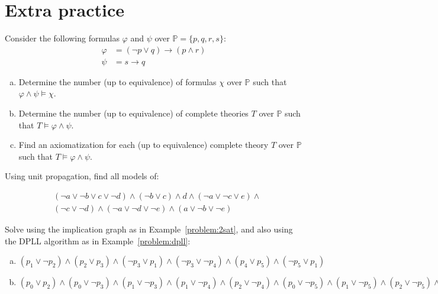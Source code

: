     
\section*{Extra practice}
    

\begin{problem}

    Consider the following formulas $\varphi$ and $\psi$ over $\mathbb P=\{p, q, r, s\}$:
    \begin{align*}
        \varphi &= (\neg p \vee  q)\to(p\wedge r)\\
        \psi &= s\to q
    \end{align*}
    \begin{enumerate}[(a)]
        \item Determine the number (up to equivalence) of formulas $\chi$ over $\mathbb P$ such that $\varphi\wedge\psi\models\chi$.
        \item Determine the number (up to equivalence) of complete theories $T$ over $\mathbb P$ such that $T\models\varphi\wedge\psi$.
        \item Find an axiomatization for each (up to equivalence) complete theory $T$ over $\mathbb P$ such that $T\models\varphi\wedge\psi$.
    \end{enumerate}

\end{problem}


\begin{problem} 
    
    Using unit propagation, find all models of:

    \begin{align*}
    &(\neg a \vee \neg b \vee c \vee \neg d)\wedge(\neg b \vee c)\wedge d \wedge (\neg a \vee \neg c \vee e)\wedge \\
    &(\neg c \vee \neg d)\wedge(\neg a \vee \neg d \vee \neg e)\wedge(a\vee \neg b \vee\neg e)
    \end{align*}

\end{problem}

    
\begin{problem} 
    
    Solve using the implication graph as in Example~\ref{problem:2sat}, and also using the DPLL algorithm as in Example~\ref{problem:dpll}:
    \begin{enumerate}[(a)]
        \item $(p_1\vee \neg p_2)\wedge (p_2\vee p_3)\wedge (\neg p_3\vee p_1)\wedge (\neg p_3\vee \neg p_4)\wedge (p_4\vee p_5)\wedge (\neg p_5\vee p_1)$
        \item $(p_0 \vee  p_2) \wedge  (p_0 \vee  \neg p_3) \wedge  (p_1 \vee  \neg p_3) 
        \wedge  (p_1 \vee  \neg p_4) \wedge  (p_2 \vee  \neg p_4) 
        \wedge  (p_0 \vee  \neg p_5)
        \wedge 
        (p_1 \vee  \neg p_5) \wedge  (p_2 \vee  \neg p_5) \wedge  (\neg p_1 \vee  \neg p_6) \wedge  (p_4 \vee  p_6) \wedge  (p_5 \vee  p_6) \wedge  p_1\wedge \neg p_7$
    \end{enumerate}

\end{problem}


